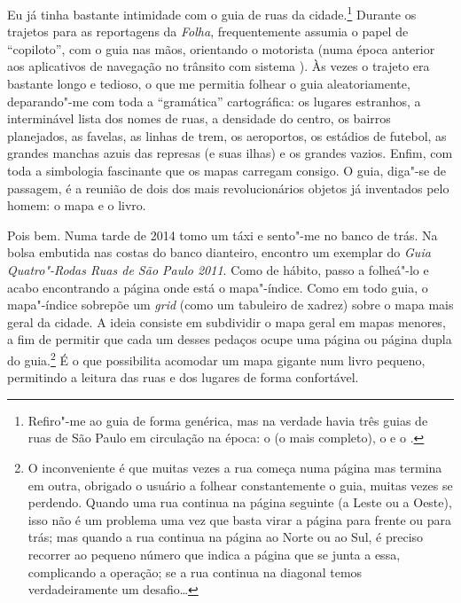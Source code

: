 Eu já tinha bastante intimidade com o guia de ruas da cidade.\footnote{Refiro"-me
  ao guia de forma genérica, mas na verdade havia três guias de ruas de
  São Paulo em circulação na época: o {} (o mais completo),
  o {} e o {}.} Durante os
trajetos para as reportagens da \emph{Folha}, frequentemente assumia o
papel de ``copiloto'', com o guia nas mãos, orientando o motorista (numa
época anterior aos aplicativos de navegação no trânsito com sistema
). Às vezes o trajeto era bastante longo e tedioso, o que me permitia
folhear o guia aleatoriamente, deparando"-me com toda a ``gramática''
cartográfica: os lugares estranhos, a interminável lista dos nomes de
ruas, a densidade do centro, os bairros planejados, as favelas, as
linhas de trem, os aeroportos, os estádios de futebol, as grandes
manchas azuis das represas (e suas ilhas) e os grandes vazios. Enfim,
com toda a simbologia fascinante que os mapas carregam consigo. O guia,
diga"-se de passagem, é a reunião de dois dos mais revolucionários
objetos já inventados pelo homem: o mapa e o livro.

Pois bem. Numa tarde de 2014 tomo um táxi e sento"-me no banco de trás.
Na bolsa embutida nas costas do banco dianteiro, encontro um exemplar do
\emph{Guia Quatro"-Rodas Ruas de São Paulo 2011}. Como de hábito, passo a
folheá"-lo e acabo encontrando a página onde está o mapa"-índice. Como em
todo guia, o mapa"-índice sobrepõe um \emph{grid} (como um tabuleiro de
xadrez) sobre o mapa mais geral da cidade. A ideia consiste em
subdividir o mapa geral em mapas menores, a fim de permitir que cada um
desses pedaços ocupe uma página ou página dupla do guia.\footnote{O
  inconveniente é que muitas vezes a rua começa numa página mas termina
  em outra, obrigado o usuário a folhear constantemente o guia, muitas
  vezes se perdendo. Quando uma rua continua na página seguinte (a Leste
  ou a Oeste), isso não é um problema uma vez que basta virar a página
  para frente ou para trás; mas quando a rua continua na página ao Norte
  ou ao Sul, é preciso recorrer ao pequeno número que indica a página
  que se junta a essa, complicando a operação; se a rua continua na
  diagonal temos verdadeiramente um desafio\ldots{}} É o que possibilita
acomodar um mapa gigante num livro pequeno, permitindo a leitura das
ruas e dos lugares de forma confortável.

